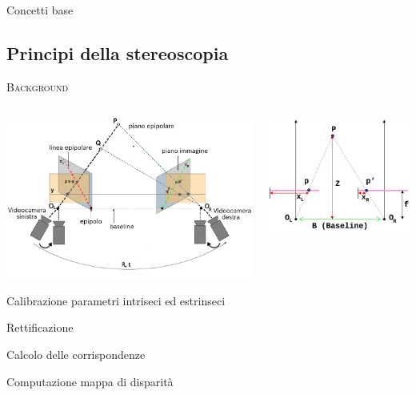 \documentclass{beamer}
\begin{document}
\begin{section}{Concetti base}
\subsection{Principi della stereoscopia}

\begin{frame}[t]{\textsc{Background}}

\begin{columns}
\begin{column}{5cm}
\includegraphics[width=1.1\linewidth]{./img/rect.png}

\begin{itemize}
\item[1.] \small{Calibrazione parametri intriseci ed estrinseci
\item[2.] Rettificazione
\item[3.] Calcolo delle corrispondenze
\item[4.] Computazione mappa di disparit\`{a}}
\end{itemize}

\end{column}

\begin{column}{5cm}
\includegraphics[width=0.8\linewidth]{./img/depth.jpg}


\end{column}
\end{columns}
\end{frame}
\end{section}
\end{document}
